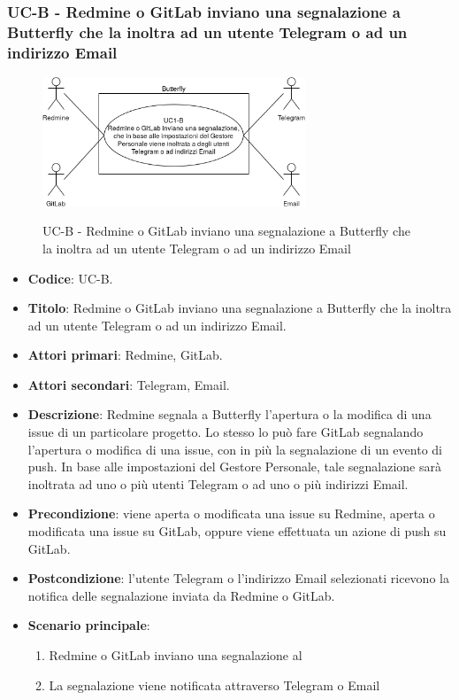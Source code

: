 \subsubsection{UC\theuccount-B - Redmine o GitLab inviano una segnalazione a Butterfly che la inoltra ad un utente Telegram o ad un indirizzo Email}
    \begin{figure}[H]
		\centering
		\includegraphics[width=0.7\textwidth]{img/casi_d'uso/UC1.png}\\
		\caption{UC\theuccount-B - Redmine o GitLab inviano una segnalazione a Butterfly che la inoltra ad un utente Telegram o ad un indirizzo Email}
	\end{figure}
	\begin{itemize}
		\item \textbf{Codice}: UC\theuccount-B.
		\item \textbf{Titolo}: Redmine o GitLab inviano una segnalazione a Butterfly che la inoltra ad un utente Telegram o ad un indirizzo Email.
		\item \textbf{Attori primari}: Redmine, GitLab.
		\item \textbf{Attori secondari}: Telegram, Email.
		\item \textbf{Descrizione}:  Redmine segnala a Butterfly l'apertura o la modifica di una issue di un particolare progetto. Lo stesso lo può fare GitLab segnalando l'apertura o modifica di una issue, con in più la segnalazione di un evento di push. In base alle impostazioni del Gestore Personale, tale segnalazione sarà inoltrata ad uno o più utenti Telegram o ad uno o più indirizzi Email.
		\item \textbf{Precondizione}: viene aperta o modificata una issue su Redmine, aperta o modificata una issue su GitLab, oppure viene effettuata un
		azione di push su GitLab.
		\item \textbf{Postcondizione}: l'utente Telegram o l'indirizzo Email selezionati ricevono la notifica delle segnalazione inviata da Redmine o GitLab.
		\item \textbf{Scenario principale}: 
		\begin{enumerate}
			\item Redmine o GitLab inviano una segnalazione al \progetto
			\item La segnalazione viene notificata attraverso Telegram o Email
		\end{enumerate}
		
	\end{itemize}